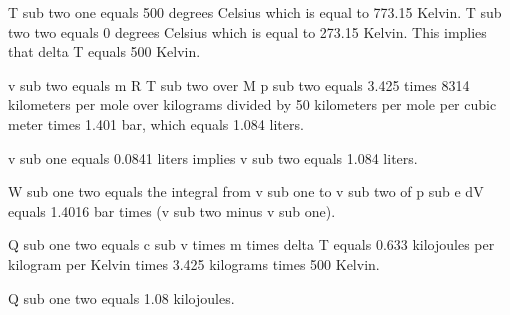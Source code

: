 T sub two one equals 500 degrees Celsius which is equal to 773.15 Kelvin. T sub two two equals 0 degrees Celsius which is equal to 273.15 Kelvin. This implies that delta T equals 500 Kelvin.

v sub two equals m R T sub two over M p sub two equals 3.425 times 8314 kilometers per mole over kilograms divided by 50 kilometers per mole per cubic meter times 1.401 bar, which equals 1.084 liters.

v sub one equals 0.0841 liters implies v sub two equals 1.084 liters.

W sub one two equals the integral from v sub one to v sub two of p sub e dV equals 1.4016 bar times (v sub two minus v sub one).

Q sub one two equals c sub v times m times delta T equals 0.633 kilojoules per kilogram per Kelvin times 3.425 kilograms times 500 Kelvin.

Q sub one two equals 1.08 kilojoules.